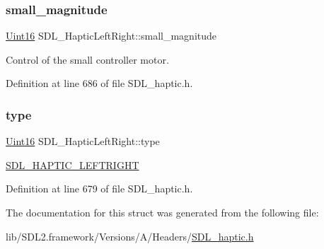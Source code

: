 \subsubsection{\texorpdfstring{small\_magnitude}{small\_magnitude}}
{\footnotesize\ttfamily \mbox{\hyperlink{_s_d_l__stdinc_8h_a31fcc0a076c9068668173ee26d33e42b}{Uint16}} S\+D\+L\+\_\+\+Haptic\+Left\+Right\+::small\+\_\+magnitude}

Control of the small controller motor. 

Definition at line 686 of file S\+D\+L\+\_\+haptic.\+h.

\mbox{\label{struct_s_d_l___haptic_left_right_abef79eeb482a8e623e512f0c9635e1a1}} 
\subsubsection{\texorpdfstring{type}{type}}
{\footnotesize\ttfamily \mbox{\hyperlink{_s_d_l__stdinc_8h_a31fcc0a076c9068668173ee26d33e42b}{Uint16}} S\+D\+L\+\_\+\+Haptic\+Left\+Right\+::type}

\mbox{\hyperlink{_s_d_l__haptic_8h_ae047624d8458ff6400887c37a36f86d3}{S\+D\+L\+\_\+\+H\+A\+P\+T\+I\+C\+\_\+\+L\+E\+F\+T\+R\+I\+G\+HT}} 

Definition at line 679 of file S\+D\+L\+\_\+haptic.\+h.



The documentation for this struct was generated from the following file\+:\begin{DoxyCompactItemize}
\item 
lib/\+S\+D\+L2.\+framework/\+Versions/\+A/\+Headers/\mbox{\hyperlink{_s_d_l__haptic_8h}{S\+D\+L\+\_\+haptic.\+h}}\end{DoxyCompactItemize}
